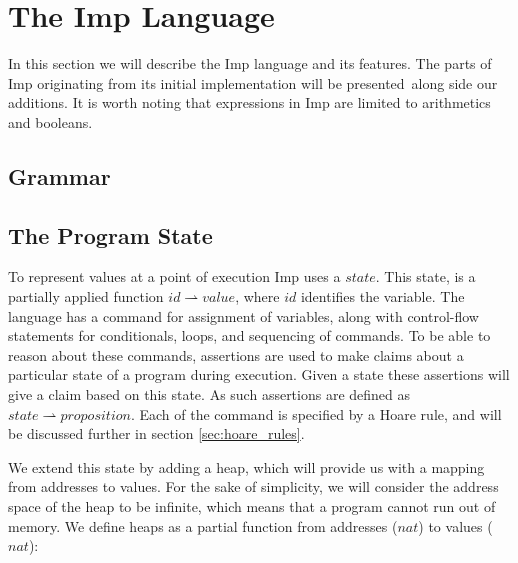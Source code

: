 \section{The Imp Language}
\label{sec:background_imp}
In this section we will describe the Imp language and its features. The parts of Imp originating from its initial implementation will be presented\,\cite{Pierce:SF} along side our additions. It is worth noting that expressions in Imp are limited to arithmetics and booleans.

\subsection{Grammar}
\subsection{The Program State}
To represent values at a point of execution Imp uses a $state$. This state, is a partially applied function $id \rightharpoonup value$, where $id$ identifies the variable. The language has a command for assignment of variables, along with control-flow statements for conditionals, loops, and sequencing of commands. To be able to reason about these commands, assertions are used to make claims about a particular state of a program during execution. Given a state these assertions will give a claim based on this state. As such assertions are defined as $state \rightharpoonup proposition$. Each of the command is specified by a Hoare rule, and will be discussed further in section \ref{sec:hoare_rules}.

We extend this state by adding a heap, which will provide us with a mapping from addresses to values. For the sake of simplicity, we will consider the address space of the heap to be infinite, which means that a program cannot run out of memory. We define heaps as a partial function from addresses ($nat$) to values ($nat$):

